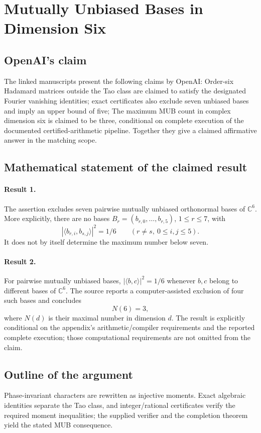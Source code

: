 \documentclass[11pt]{article}
\begin{document}
\section*{Mutually Unbiased Bases in Dimension Six}

\subsection{OpenAI's claim}
The linked manuscripts present the following claims by OpenAI: Order-six Hadamard matrices outside the Tao class are claimed to satisfy the designated Fourier vanishing identities; exact certificates also exclude seven unbiased bases and imply an upper bound of five; The maximum MUB count in complex dimension six is claimed to be three, conditional on complete execution of the documented certified-arithmetic pipeline. Together they give a claimed affirmative answer in the matching scope.

\subsection{Mathematical statement of the claimed result}
\paragraph{Result 1.} The assertion excludes seven pairwise mutually unbiased orthonormal bases of \(\mathbb C^6\). More explicitly, there are no bases \(B_r=(b_{r,0},\ldots,b_{r,5})\), \(1\le r\le7\), with
\[
 |\langle b_{r,i},b_{s,j}\rangle|^2=1/6
 \qquad(r\ne s,\ 0\le i,j\le5).
\]
It does not by itself determine the maximum number below seven.

\paragraph{Result 2.} For pairwise mutually unbiased bases, \(|\langle b,c\rangle|^2=1/6\) whenever \(b,c\) belong to different bases of \(\mathbb C^6\). The source reports a computer-assisted exclusion of four such bases and concludes
\[
 N(6)=3,
\]
where \(N(d)\) is their maximal number in dimension \(d\). The result is explicitly conditional on the appendix's arithmetic/compiler requirements and the reported complete execution; those computational requirements are not omitted from the claim.

\subsection{Outline of the argument}
Phase-invariant characters are rewritten as injective moments. Exact algebraic identities separate the Tao class, and integer/rational certificates verify the required moment inequalities; the supplied verifier and the completion theorem yield the stated MUB consequence.
\end{document}
